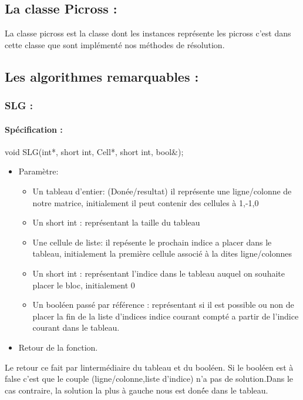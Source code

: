 \documentclass{article}
\begin{document}
\subsection{ La classe Picross :}
La classe picross est la classe dont les instances repr\'esente les picross c'est dans cette classe que sont impl\'ement\'e nos m\'ethodes de r\'esolution.
\subsection{Les algorithmes remarquables :}
\subsubsection{SLG :}
\paragraph{Sp\'ecification :}
 void SLG(int*, short int, Cell*, short int, bool\&);
\begin{itemize}
\item Param\`etre:
\begin{itemize}
\item Un tableau d'entier: (Don\'ee/resultat) il repr\'esente une ligne/colonne de notre matrice, initialement il peut contenir des cellules \`a 1,-1,0
\item Un short int : repr\'esentant la taille du tableau
\item Une cellule de liste: il rep\'esente le prochain indice a placer dans le tableau, initialement la premi\`ere cellule associ\'e \`a la dites ligne/colonnes
\item Un short int : repr\'esentant l'indice dans le tableau auquel on souhaite placer le bloc, initialement 0
\item Un bool\'een pass\'e par r\'ef\'erence : repr\'esentant si il est possible ou non de placer la fin de la liste d'indices indice courant compt\'e a partir de l'indice courant dans le tableau.
\end{itemize}
\item Retour de la fonction.
\end{itemize}
Le retour ce fait par linterm\'ediaire du tableau  et du bool\'een. Si le bool\'een est \`a false c'est que le couple (ligne/colonne,liste d'indice) n'a pas de solution.Dans le cas contraire, la solution la plus \`a gauche nous est don\'\'ee dans le tableau.
\end{document}
